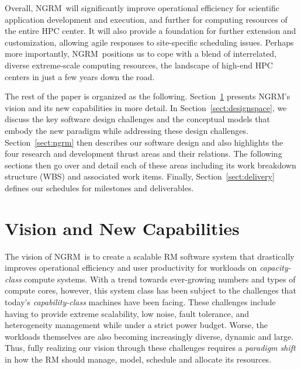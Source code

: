 \documentclass{article}
\newcommand{\ngrm}{NGRM}
\begin{document}
Overall, \ngrm\ will significantly improve operational efficiency for
scientific application development and execution, and further for computing
resources of the entire HPC center.  It will also provide
a foundation for further extension and customization, allowing agile responses
to site-specific scheduling issues. Perhaps more importantly, \ngrm\
positions us to cope with a blend of interrelated, diverse
extreme-scale computing resources, the landscape of high-end HPC centers
in just a few years down the road.

The rest of the paper is organized as the following.
Section~\ref{sect:vision} presents \ngrm's vision and 
its new capabilities in more detail. 
In Section~\ref{sect:designspace}, we discuss 
the key software design challenges and the conceptual models
that embody the new paradigm while addressing these design challenges. 
Section~\ref{sect:ngrm} then describes our software design
and also highlights the four research and development thrust areas
and their relations. 
The following sections then go over and detail each of these areas including 
its work breakdown structure (WBS) and associated work items.
Finally, Section~\ref{sect:delivery} defines
our schedules for milestones and deliverables.


\section{Vision and New Capabilities}
\label{sect:vision}

The vision of \ngrm\ is to create a scalable RM software system that 
drastically improves operational efficiency and user productivity 
for workloads on {\em capacity-class} compute systems.
With a trend towards ever-growing numbers and types of compute cores, however,
this system class has been subject to the challenges that
today's {\em capability-class} machines have been facing. 
These challenges include having to provide extreme scalability, low noise, 
fault tolerance, and heterogeneity management while under a strict power budget.
Worse, the workloads themselves are also becoming increasingly diverse, 
dynamic and large. Thus, fully realizing our vision through these challenges requires
a {\em paradigm shift} in how the RM should manage, model, schedule 
and allocate its resources.
\end{document}
